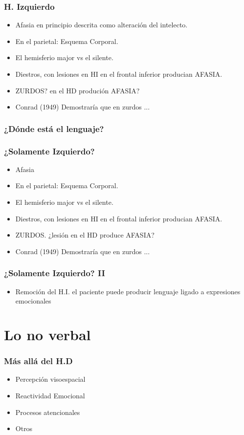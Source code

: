 \documentclass{beamer}
\begin{document}
		\begin{frame}
			\transfade
			\frametitle{H. Izquierdo}
			\begin{itemize}
				\item Afasia en principio descrita como alteración del intelecto.
				\pause
				\item En el parietal: Esquema Corporal.
				\pause
				\item El hemisferio major vs el silente.
				\pause
				\item Diestros, con lesiones en HI en el frontal inferior producian AFASIA.
				\pause
				\item ZURDOS? en el HD produción AFASIA?
				\pause
				\item Conrad (1949) Demostraría que en zurdos ...
			\end{itemize}
		\end{frame}

\begin{frame}
	\transfade
	\frametitle{¿Dónde está el lenguaje?}
\centering
{}

\end{frame}


\begin{frame}
	\transfade
	\frametitle{¿Solamente Izquierdo?}
	\begin{itemize}
	\item Afasia
	\pause
	\item En el parietal: Esquema Corporal.
	\pause
	\item El hemisferio major vs el silente.
	\pause
	\item Diestros, con lesiones en HI en el frontal inferior producian AFASIA.
	\pause
	\item ZURDOS. ¿lesión en el HD produce AFASIA?
	\pause
	\item Conrad (1949) Demostraría que en zurdos ...
	\end{itemize}
\end{frame}

\begin{frame}
	\transfade
	\frametitle{¿Solamente Izquierdo? II}
	\begin{itemize}
		\item Remoción del H.I. el paciente puede producir lenguaje ligado a expresiones emocionales
	\end{itemize}
\end{frame}

\section{Lo no verbal}

\begin{frame}
	\transfade
	\frametitle{Más allá del H.D}
	\begin{itemize}
		\item Percepción visoespacial
		\pause
		\item Reactividad Emocional
		\pause
		\item Procesos atencionales
		\pause
		\item Otros
	\end{itemize}
\end{frame}
		
\end{document}
